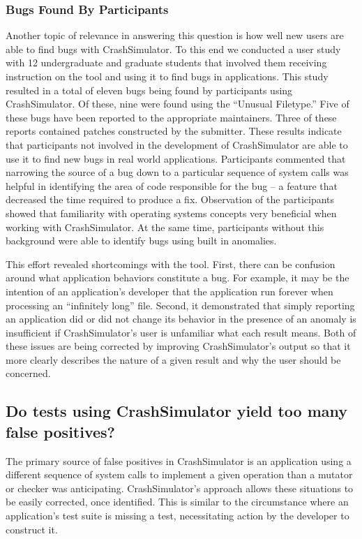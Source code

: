 \subsubsection{Bugs Found By Participants}

Another topic of relevance in answering this question is how well new users are
able to find bugs with CrashSimulator.
To this end we conducted a user study with 12 undergraduate and
graduate students that involved them receiving instruction on the tool and
using it to find bugs in applications. This study resulted in a total of
eleven bugs being found by participants using
CrashSimulator.  Of these, nine were found using the ``Unusual Filetype.''
Five of these bugs have been reported to the appropriate maintainers.
Three of these reports contained patches constructed by the submitter.
These results indicate that participants
not involved in the development of
CrashSimulator are able to use it to find new bugs in real world
applications.  Participants commented that narrowing the source of a bug
down to a particular sequence of system calls
was helpful in identifying the area of
code responsible for the bug -- a feature
that decreased the time required to produce a fix.
Observation of the participants showed
that familiarity with operating systems concepts
very beneficial when working with CrashSimulator.  At
the same time, participants without this background were
able to identify bugs using built in
anomalies.

This effort revealed shortcomings with the tool.  First,  there can be
confusion around what application behaviors constitute a bug.  For example,
it may be the intention of an application's developer that the application
run forever when processing an ``infinitely long'' file.  Second, it
demonstrated that
simply reporting an application did or did not change its behavior in
the presence of an anomaly is insufficient if CrashSimulator's user is
unfamiliar what each result means.  Both of these issues are being corrected
by improving CrashSimulator's output so that it more clearly describes
the nature of a given result and why the user should be concerned.


\subsection{Do tests using CrashSimulator yield too many false positives?}
\label{sec-sorts-errors}

The primary source of false positives in CrashSimulator is an application
using a different sequence of system calls to implement a given operation
than a mutator or checker was anticipating.
CrashSimulator's approach allows these
situations to be easily corrected, once identified.
This is similar to the circumstance where an
application's test suite is missing a test, necessitating action by the
developer to construct it.

